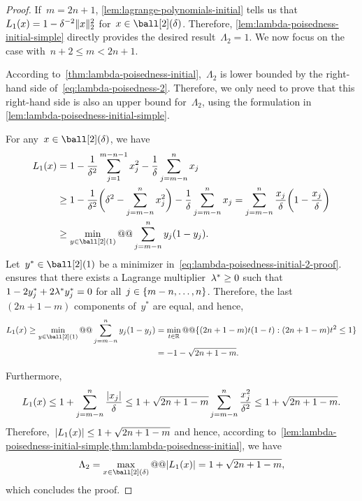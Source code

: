 \begin{proof}
    If~$m = 2n + 1$, \cref{lem:lagrange-polynomials-initial} tells us that~$\lagp[1](\iter) = 1 - \delta^{-2} \norm{x}_2^2$ for~$\iter \in \ball[2](\delta)$.
    Therefore, \cref{lem:lambda-poisedness-initial-simple} directly provides the desired result~$\Lambda_2 = 1$.
    We now focus on the case with~$n + 2 \le m < 2n + 1$.

    According to~\cref{thm:lambda-poisedness-initial},~$\Lambda_2$ is lower bounded by the right-hand side of~\cref{eq:lambda-poisedness-2}.
    Therefore, we only need to prove that this right-hand side is also an upper bound for~$\Lambda_2$, using the formulation in \cref{lem:lambda-poisedness-initial-simple}.
    
    For any~$\iter \in \ball[2](\delta)$, we have
    \begin{subequations}
        \begin{align}
            \lagp[1](\iter) &= 1 - \frac{1}{\delta^2} \sum_{j = 1}^{m - n - 1} x_j^2 - \frac{1}{\delta} \sum_{j = m - n}^n x_j\\
                            &\ge 1 - \frac{1}{\delta^2} \bigg( \delta^2 - \sum_{j = m - n}^n x_j^2 \bigg) - \frac{1}{\delta} \sum_{j = m - n}^n x_j = \sum_{j = m - n}^n \frac{x_j}{\delta} \bigg( 1 - \frac{x_j}{\delta} \bigg)\\
                            &\ge \min_{y \in \ball[2](1)} @@ \sum_{j = m - n}^n y_j (1 - y_j). \label{eq:lambda-poisedness-initial-2-proof}
        \end{align}
    \end{subequations}
    Let~$y^{\ast} \in \ball[2](1)$ be a minimizer in~\cref{eq:lambda-poisedness-initial-2-proof}.
     ensures that there exists a Lagrange multiplier~$\lm[\ast] \ge 0$ such that~$1 - 2 y_j^{\ast} + 2 \lm[\ast] y_j^{\ast} = 0$ for all~$j \in \{m - n, \dots, n\}$.
    Therefore, the last~$(2n + 1 - m)$ components of~$y^{\ast}$ are equal, and hence,
    \begin{align*}
        \lagp[1](\iter) \ge \min_{y \in \ball[2](1)} @@ \sum_{j = m - n}^n y_j (1 - y_j)    & = \min_{t \in \R} @@ \set{(2n + 1 - m) t (1 - t) : (2n + 1 - m) t^2 \le 1}\\
                                                                                            & = -1 - \sqrt{2n + 1 - m}.
    \end{align*}

    Furthermore,
    \begin{equation*}
        \lagp[1](\iter) \le 1 + \sum_{j = m - n}^n \frac{\abs{x_j}}{\delta} \le 1 + \sqrt{2n + 1 - m} \sum_{j = m - n}^n \frac{x_j^2}{\delta^2} \le 1 + \sqrt{2n + 1 - m}.
    \end{equation*}
    Therefore,~$\abs{\lagp[1](\iter)} \le 1 + \sqrt{2n + 1 - m}$ and hence, according to~\cref{lem:lambda-poisedness-initial-simple,thm:lambda-poisedness-initial}, we have
    \begin{equation*}
        \Lambda_2 = \max_{\iter \in \ball[2](\delta)} @@ \abs{\lagp[1](\iter)} = 1 + \sqrt{2n + 1 - m},
    \end{equation*}
    which concludes the proof.
\end{proof}

